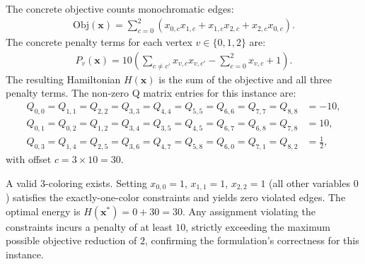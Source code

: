 \documentclass[12pt]{article}
\begin{document}
The concrete objective counts monochromatic edges:
\begin{align}
    \text{Obj}(\mathbf{x}) = \sum_{c=0}^{2} \left( x_{0,c}x_{1,c} + x_{1,c}x_{2,c} + x_{2,c}x_{0,c} \right).
\end{align}
The concrete penalty terms for each vertex $v \in \{0,1,2\}$ are:
\begin{align}
    P_v(\mathbf{x}) = 10 \left( \sum_{c \neq c'} x_{v,c}x_{v,c'} - \sum_{c=0}^{2} x_{v,c} + 1 \right).
\end{align}
The resulting Hamiltonian $H(\mathbf{x})$ is the sum of the objective and all three penalty terms. The non-zero Q matrix entries for this instance are:
\begin{align}
    Q_{0,0} = Q_{1,1} = Q_{2,2} = Q_{3,3} = Q_{4,4} = Q_{5,5} = Q_{6,6} = Q_{7,7} = Q_{8,8} &= -10, \\
    Q_{0,1} = Q_{0,2} = Q_{1,2} = Q_{3,4} = Q_{3,5} = Q_{4,5} = Q_{6,7} = Q_{6,8} = Q_{7,8} &= 10, \\
    Q_{0,3} = Q_{1,4} = Q_{2,5} = Q_{3,6} = Q_{4,7} = Q_{5,8} = Q_{6,0} = Q_{7,1} = Q_{8,2} &= \frac{1}{2},
\end{align}
with offset $c = 3 \times 10 = 30$.

A valid 3-coloring exists. Setting $x_{0,0}=1$, $x_{1,1}=1$, $x_{2,2}=1$ (all other variables $0$) satisfies the exactly-one-color constraints and yields zero violated edges. The optimal energy is $H(\mathbf{x}^*) = 0 + 30 = 30$. Any assignment violating the constraints incurs a penalty of at least $10$, strictly exceeding the maximum possible objective reduction of $2$, confirming the formulation's correctness for this instance.
\end{document}
